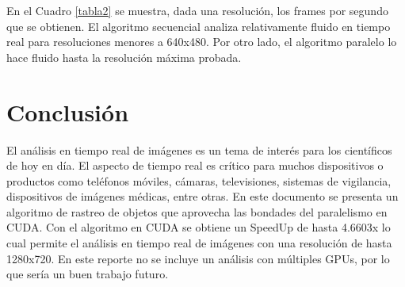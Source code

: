 \documentclass[a4paper]{article}
\begin{document}
En el Cuadro \ref{tabla2} se muestra, dada una resolución, los frames por segundo que se obtienen. El algoritmo secuencial analiza relativamente fluido en tiempo real para resoluciones menores a 640x480. Por otro lado, el algoritmo paralelo lo hace fluido hasta la resolución máxima probada.

\section{Conclusión}
El análisis en tiempo real de imágenes es un tema de interés para los científicos de hoy en día.  El aspecto de tiempo real es crítico para muchos dispositivos o productos como teléfonos móviles, cámaras, televisiones, sistemas de vigilancia, dispositivos de imágenes médicas, entre otras. En este documento se presenta un algoritmo de rastreo de objetos que aprovecha las bondades del paralelismo en CUDA. Con el algoritmo en CUDA se obtiene un SpeedUp de hasta 4.6603x lo cual permite el análisis en tiempo real de imágenes con una resolución de hasta 1280x720. En este reporte no se incluye un análisis con múltiples GPUs, por lo que sería un buen trabajo futuro.




\end{document}
